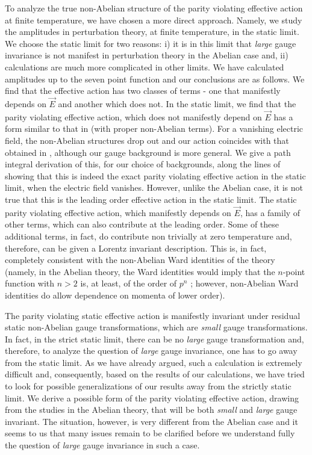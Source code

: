 \documentclass[a4paper,12pt]{article}
\begin{document}
To analyze the true non-Abelian structure of the parity violating
effective action at finite temperature, we have chosen a more direct
approach. Namely, we study the amplitudes in perturbation theory, at
finite temperature, in the static limit. We choose the static limit
for two reasons: i) it is in this limit that {\it large} gauge
invariance is not manifest in perturbation theory in the Abelian case
and, ii) calculations are much more complicated in other limits. We
have calculated amplitudes up to the seven point function and our
conclusions are as follows. We find that the effective action has two
classes of terms - one that manifestly depends on $\vec{E}$ and another
which does not. In the static limit, we find that the parity violating
effective action, which does not manifestly depend on $\vec{E}$  has a
form  similar to that in \cite{fosco:1997vu}
(with proper non-Abelian terms). For a vanishing electric field, the
non-Abelian structures drop out and our action coincides with that
obtained in \cite{fosco:1997vu}, although our gauge background is more general.
We give a path integral derivation of this, for our choice of
backgrounds,  along the lines of
\cite{fosco:1997vu} showing that this is indeed the
exact parity 
violating effective action in the static limit, when the electric
field  vanishes. However, unlike the Abelian case, it is not true that 
this is the leading order effective action in the static limit. 
The static parity violating effective action, which manifestly depends
on $\vec{E}$, has a family of other terms, which can also 
contribute at the leading order. Some of these additional terms, in
fact, do contribute non trivially at zero
temperature and, therefore, can be given a Lorentz invariant
description. 
This is, in fact, completely consistent with
the non-Abelian Ward identities of the theory (namely, in the Abelian
theory, the Ward identities would imply that the $n$-point function
with $n>2$ is, at least, of the order of $p^{n}$
\cite{coleman:1985zi}; however,   non-Abelian
Ward identities do allow dependence on momenta of lower order).

The parity violating static effective action is manifestly invariant
under residual static non-Abelian gauge transformations, which are
{\it small} gauge transformations. In fact, in the strict static
limit, there can be no {\it large} gauge transformation and,
therefore, to analyze the question of {\it large} gauge invariance,
one has to go away from the static limit. As we have already
argued, such a calculation is extremely difficult and,
consequently, based on the results of our calculations, we have tried
to look for possible generalizations of our results away from the
strictly static limit. We derive a possible form of the parity
violating effective action, drawing from the studies in the Abelian
theory,  that will be both {\it small} and {\it large} gauge
invariant. The situation, however, is very different from the Abelian
case and it seems to us that many issues remain to be clarified before
we understand fully the question of {\it  large}  gauge invariance in
such a case. 
\end{document}
